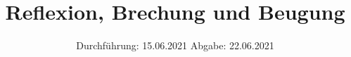 

\subject{V400}
\title{Reflexion, Brechung und Beugung}
\date{%
  Durchführung: 15.06.2021
  \hspace{3em}
  Abgabe: 22.06.2021
}



\maketitle
\thispagestyle{empty}
\tableofcontents
\newpage






\printbibliography{}


